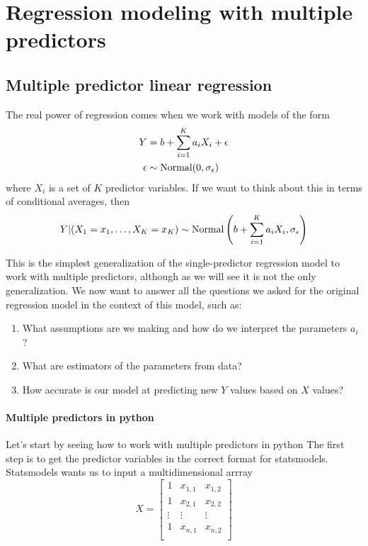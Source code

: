 \chapter{Regression modeling with multiple predictors}





\section{Multiple predictor linear regression}

The real power of regression comes when we work with models of the form 
\begin{align}
Y &= b + \sum_{i=1}^K a_iX_i + \epsilon\\
\epsilon &\sim {\rm Normal}(0,\sigma_{\epsilon})
\end{align}
where $X_i$ is a set of $K$ predictor variables. If we want to think about this in terms of conditional averages, then 
\begin{equation}
Y|(X_1=x_1,\dots,X_K=x_K) \sim {\rm Normal}\left( b + \sum_{i=1}^K a_iX_i,\sigma_{\epsilon}\right)
\end{equation}

This is the simplest generalization of the single-predictor regression model to work with multiple predictors, although as we will see it is not the only generalization. We now want to answer all the questions we asked for the original regression model in the context of this model, such as: 
\begin{enumerate}
\item What assumptions are we making and how do we interpret the parameters $a_i$? 
\item What are estimators of the parameters from data? 
\item How accurate is our model at predicting new $Y$ values based on $X$ values? 
\end{enumerate}



\subsubsection{Multiple predictors in python}
Let's start by seeing how to work with multiple predictors in python
The first step is to get the predictor variables in the correct format for statsmodels. Statsmodels wants us to input a multidimensional arrray 
\begin{equation}
X = \left[\begin{array}{ccc}
1 &x_{1,1}& x_{1,2}\\
1 &x_{2,1}& x_{2,2}\\
\vdots & \vdots & \vdots\\
1 &x_{n,1}& x_{n,2}\\
\end{array} \right]
\end{equation}

